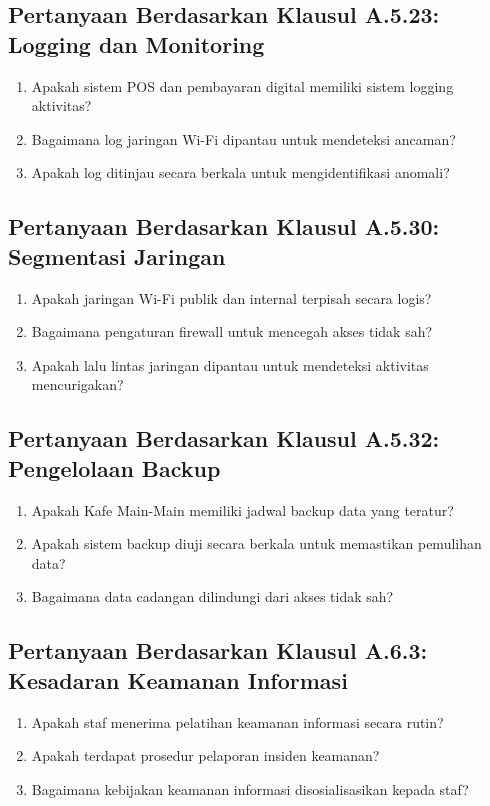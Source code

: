 \documentclass[12pt, a4paper]{report}
\begin{document}
\subsection{Pertanyaan Berdasarkan Klausul A.5.23: Logging dan Monitoring}
\begin{enumerate}
    \item Apakah sistem POS dan pembayaran digital memiliki sistem logging aktivitas?
    \item Bagaimana log jaringan Wi-Fi dipantau untuk mendeteksi ancaman?
    \item Apakah log ditinjau secara berkala untuk mengidentifikasi anomali? \citep{sari2023backup}
\end{enumerate}

\subsection{Pertanyaan Berdasarkan Klausul A.5.30: Segmentasi Jaringan}
\begin{enumerate}
    \item Apakah jaringan Wi-Fi publik dan internal terpisah secara logis?
    \item Bagaimana pengaturan firewall untuk mencegah akses tidak sah?
    \item Apakah lalu lintas jaringan dipantau untuk mendeteksi aktivitas mencurigakan? \citep{haryanto2021wifi}
\end{enumerate}

\subsection{Pertanyaan Berdasarkan Klausul A.5.32: Pengelolaan Backup}
\begin{enumerate}
    \item Apakah Kafe Main-Main memiliki jadwal backup data yang teratur?
    \item Apakah sistem backup diuji secara berkala untuk memastikan pemulihan data?
    \item Bagaimana data cadangan dilindungi dari akses tidak sah? \citep{sari2023backup}
\end{enumerate}

\subsection{Pertanyaan Berdasarkan Klausul A.6.3: Kesadaran Keamanan Informasi}
\begin{enumerate}
    \item Apakah staf menerima pelatihan keamanan informasi secara rutin?
    \item Apakah terdapat prosedur pelaporan insiden keamanan?
    \item Bagaimana kebijakan keamanan informasi disosialisasikan kepada staf? \citep{pratama2022pelatihan}
\end{enumerate}
\end{document}

